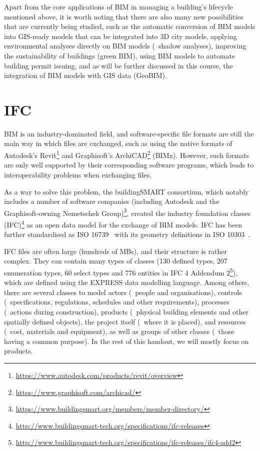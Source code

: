 Apart from the core applications of BIM in managing a building's lifecycle mentioned above, it is worth noting that there are also many new possibilities that are currently being studied, such as the automatic conversion of BIM models into GIS-ready models that can be integrated into 3D city models, applying environmental analyses directly on BIM models (\eg\ shadow analyses), improving the sustainability of buildings (green BIM), using BIM models to automate building permit issuing, and as will be further discussed in this course, the integration of BIM models with GIS data (GeoBIM).

\section{IFC}

BIM is an industry-dominated field, and software-specific file formats are still the main way in which files are exchanged, such as using the native formats of Autodesk's Revit\footnote{\url{https://www.autodesk.com/products/revit/overview}} and Graphisoft's ArchiCAD\footnote{\url{https://www.graphisoft.com/archicad/}} (BIMx).
However, such formats are only well supported by their corresponding software programs, which leads to interoperability problems when exchanging files.

As a way to solve this problem, the buildingSMART consortium, which notably includes a number of software companies (including Autodesk and the Graphisoft-owning Nemetschek Group)\footnote{\url{https://www.buildingsmart.org/members/member-directory/}}, created the industry foundation classes (IFC)\footnote{\url{http://www.buildingsmart-tech.org/specifications/ifc-releases}} as an open data model for the exchange of BIM models.
IFC has been further standardised as ISO 16739~\citep{ISO16739:2013} with its geometry definitions in ISO 10303~\citep{ISO10303:2014}.

IFC files are often large (hundreds of MBs), and their structure is rather complex.
They can contain many types of classes (130 defined types, 207 enumeration types, 60 select types and 776 entities in IFC 4 Addendum 2\footnote{\url{http://www.buildingsmart-tech.org/specifications/ifc-releases/ifc4-add2}}), which are defined using the EXPRESS data modelling language.
Among others, there are several classes to model actors (\eg\ people and organisations), controls (\eg\ specifications, regulations, schedules and other requirements), processes (\eg\ actions during construction), products (\eg\ physical building elements and other spatially defined objects), the project itself (\eg\ where it is placed), and resources (\eg\ cost, materials and equipment), as well as groups of other classes (\eg\ those having a common purpose).
In the rest of this handout, we will mostly focus on products.

